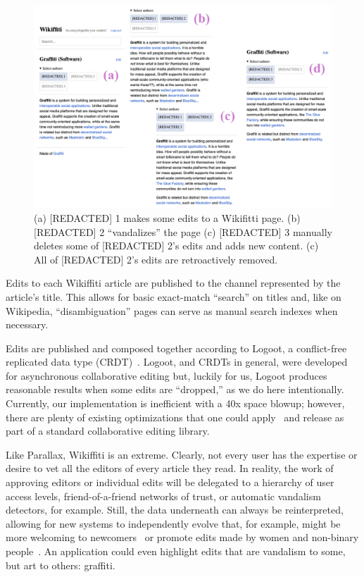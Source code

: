 \begin{figure}[htb]
    \centering
    \includegraphics[width=\textwidth]{paper/figures/wikiffiti.png}
    \caption{(a) [REDACTED] 1 makes some edits to a Wikifitti page. (b) [REDACTED] 2 ``vandalizes'' the page (c) [REDACTED] 3 manually deletes some of [REDACTED] 2's edits and adds new content. (c) All of [REDACTED] 2's edits are retroactively removed.
    }

    \label{case-studies:fig:wikiffiti}
\end{figure}

Edits to each Wikiffiti article are published to
the channel represented by the article's title.
This allows for basic exact-match ``search'' on titles and, like on Wikipedia,
``disambiguation'' pages can serve as manual search indexes when necessary.

Edits are published and composed together according to Logoot,
a conflict-free replicated data type (CRDT)~\cite{logoot,crdts}.
Logoot, and CRDTs in general, were developed for asynchronous collaborative editing
but, luckily for us, Logoot produces reasonable results when
some edits are ``dropped,'' as we do here intentionally.
Currently, our implementation is inefficient with a 40x space blowup;
however, there are plenty of existing optimizations that one could apply~\cite{logootbetter}
and release as part of a standard collaborative editing library.

Like Parallax, Wikiffiti is an extreme. Clearly, not every user
has the expertise or desire to vet all the editors of
every article they read. In reality, the work of approving editors
or individual edits will be delegated to
a hierarchy of user access levels,
friend-of-a-friend networks of trust,
or automatic vandalism detectors, for example.
Still, the data underneath can always be reinterpreted, allowing
for new systems to independently evolve that,
for example, might be more welcoming to newcomers~\cite{wikibourgeoisie, wikirisedecline}
or promote edits made by women and non-binary people~\cite{wikigender}.
An application could even highlight edits that are vandalism to some,
but art to others: graffiti.



